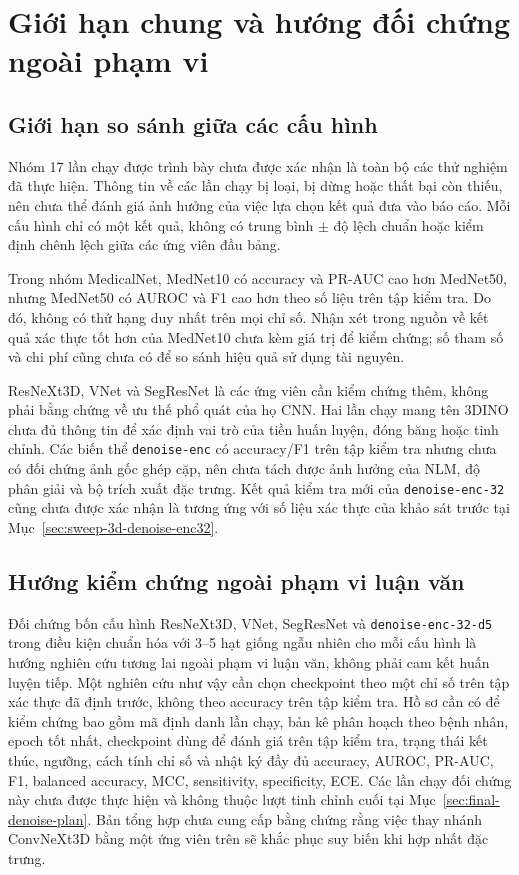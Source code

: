 \documentclass[14pt,a4paper,oneside]{extreport}
\begin{document}
\section{Giới hạn chung và hướng đối chứng ngoài phạm vi}
\subsection{Giới hạn so sánh giữa các cấu hình}
Nhóm 17 lần chạy được trình bày chưa được xác nhận là toàn bộ các thử nghiệm đã
thực hiện. Thông tin về các lần chạy bị loại, bị dừng hoặc thất bại còn thiếu,
nên chưa thể đánh giá ảnh hưởng của việc lựa chọn kết quả đưa vào báo cáo. Mỗi cấu hình chỉ
có một kết quả, không có trung bình $\pm$ độ lệch chuẩn hoặc kiểm định
chênh lệch giữa các ứng viên đầu bảng.

Trong nhóm MedicalNet, MedNet10 có accuracy và PR-AUC cao hơn MedNet50,
nhưng MedNet50 có AUROC và F1 cao hơn theo số liệu trên tập kiểm tra.
Do đó, không có thứ hạng duy nhất trên mọi chỉ số. Nhận xét trong nguồn
về kết quả xác thực tốt hơn của MedNet10 chưa kèm giá trị để kiểm chứng;
số tham số và chi phí cũng chưa có để so sánh hiệu quả sử dụng tài nguyên.

ResNeXt3D, VNet và SegResNet là các ứng viên cần kiểm chứng thêm, không
phải bằng chứng về ưu thế phổ quát của họ CNN. Hai lần chạy mang tên 3DINO chưa
đủ thông tin để xác định vai trò của tiền huấn luyện, đóng băng hoặc tinh chỉnh.
Các biến thể \texttt{denoise-enc} có accuracy/F1 trên tập kiểm tra nhưng chưa có đối
chứng ảnh gốc ghép cặp, nên chưa tách được ảnh hưởng của NLM, độ phân
giải và bộ trích xuất đặc trưng. Kết quả kiểm tra mới của \texttt{denoise-enc-32} cũng chưa
được xác nhận là tương ứng với số liệu xác thực của khảo sát trước tại
Mục~\ref{sec:sweep-3d-denoise-enc32}.

\subsection{Hướng kiểm chứng ngoài phạm vi luận văn}
Đối chứng bốn cấu hình ResNeXt3D, VNet, SegResNet và
\texttt{denoise-enc-32-d5} trong điều kiện chuẩn hóa với 3--5 hạt giống
ngẫu nhiên cho mỗi cấu hình là hướng nghiên cứu tương lai ngoài phạm vi
luận văn, không phải cam kết huấn luyện tiếp. Một nghiên cứu như vậy cần
chọn checkpoint theo một chỉ số trên tập xác thực đã định trước,
không theo accuracy trên tập kiểm tra. Hồ sơ cần có để kiểm chứng bao gồm
mã định danh lần chạy, bản kê phân hoạch theo bệnh nhân, epoch tốt nhất,
checkpoint dùng để đánh giá trên tập kiểm tra, trạng thái kết thúc, ngưỡng,
cách tính chỉ số và nhật ký đầy đủ accuracy, AUROC, PR-AUC, F1, balanced accuracy,
MCC, sensitivity, specificity, ECE. Các lần chạy đối chứng này chưa được
thực hiện và không thuộc lượt tinh chỉnh cuối tại
Mục~\ref{sec:final-denoise-plan}. Bản tổng hợp chưa cung cấp bằng chứng rằng việc thay nhánh
ConvNeXt3D bằng một ứng viên trên sẽ khắc phục suy biến khi hợp nhất đặc trưng.
\FloatBarrier
\end{document}
